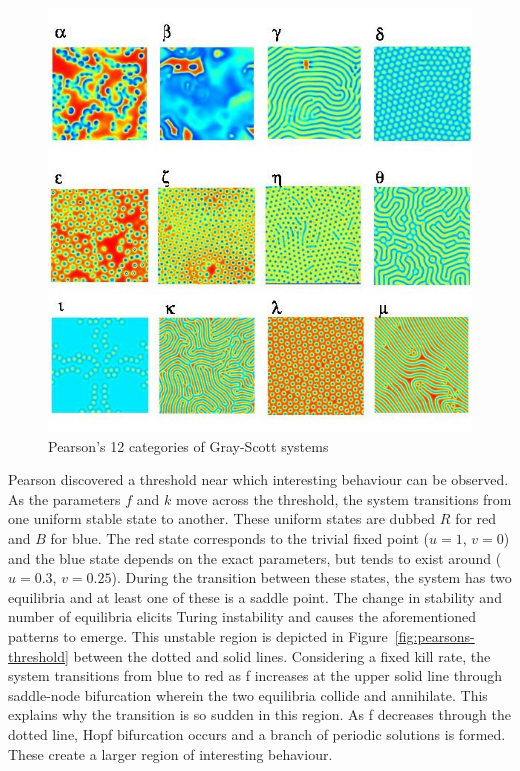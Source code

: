 \begin{figure}[!h]
\centering
\includegraphics[width=.8\textwidth]{images/pearsons.jpg}
\caption{Pearson's 12 categories of Gray-Scott systems\cite{pearson1993complex}}
\label{fig:pearsons}
\end{figure}

Pearson discovered a threshold near which interesting behaviour can be observed. As the parameters $f$ and $k$ move across the threshold, the system transitions from one uniform stable state to another. These uniform states are dubbed $R$ for red and $B$ for blue. The red state corresponds to the trivial fixed point ($u = 1$, $v = 0$) and the blue state depends on the exact parameters, but tends to exist around ($u = 0.3$, $v = 0.25$). During the transition between these states, the system has two equilibria and at least one of these is a saddle point. The change in stability and number of equilibria elicits Turing instability and causes the aforementioned patterns to emerge. This unstable region is depicted in Figure~\ref{fig:pearsons-threshold} between the dotted and solid lines. Considering a fixed kill rate, the system transitions from blue to red as f increases at the upper solid line through saddle-node bifurcation wherein the two equilibria collide and annihilate. This explains why the transition is so sudden in this region. As f decreases through the dotted line, Hopf bifurcation occurs and a branch of periodic solutions is formed. These create a larger region of interesting behaviour.
\pagebreak

